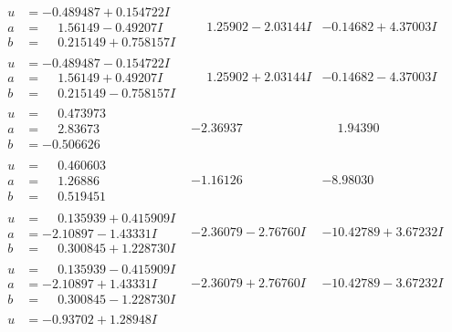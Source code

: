 \documentclass[1p]{elsarticle_modified}
\theoremstyle{definition}
\begin{document}
$$\begin{array}{c|c|c}
 \hline 
\begin{aligned}
u &= -0.489487 + 0.154722 I \\
a &= \phantom{-}1.56149 - 0.49207 I \\
b &= \phantom{-}0.215149 + 0.758157 I\end{aligned}
 & \phantom{-}1.25902 - 2.03144 I & -0.14682 + 4.37003 I \\ \hline\begin{aligned}
u &= -0.489487 - 0.154722 I \\
a &= \phantom{-}1.56149 + 0.49207 I \\
b &= \phantom{-}0.215149 - 0.758157 I\end{aligned}
 & \phantom{-}1.25902 + 2.03144 I & -0.14682 - 4.37003 I \\ \hline\begin{aligned}
u &= \phantom{-}0.473973\phantom{ +0.000000I} \\
a &= \phantom{-}2.83673\phantom{ +0.000000I} \\
b &= -0.506626\phantom{ +0.000000I}\end{aligned}
 & -2.36937\phantom{ +0.000000I} & \phantom{-}1.94390\phantom{ +0.000000I} \\ \hline\begin{aligned}
u &= \phantom{-}0.460603\phantom{ +0.000000I} \\
a &= \phantom{-}1.26886\phantom{ +0.000000I} \\
b &= \phantom{-}0.519451\phantom{ +0.000000I}\end{aligned}
 & -1.16126\phantom{ +0.000000I} & -8.98030\phantom{ +0.000000I} \\ \hline\begin{aligned}
u &= \phantom{-}0.135939 + 0.415909 I \\
a &= -2.10897 - 1.43331 I \\
b &= \phantom{-}0.300845 + 1.228730 I\end{aligned}
 & -2.36079 - 2.76760 I & -10.42789 + 3.67232 I \\ \hline\begin{aligned}
u &= \phantom{-}0.135939 - 0.415909 I \\
a &= -2.10897 + 1.43331 I \\
b &= \phantom{-}0.300845 - 1.228730 I\end{aligned}
 & -2.36079 + 2.76760 I & -10.42789 - 3.67232 I \\ \hline\begin{aligned}
u &= -0.93702 + 1.28948 I \\

\end{aligned}
\end{array}$$
\end{document}
